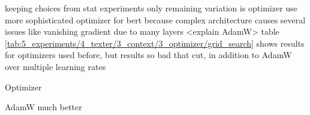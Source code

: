 keeping choices from stat experiments only remaining variation is optimizer
use more sophisticated optimizer for bert because complex architecture causes several issues like vanishing gradient due to many layers
<explain AdamW>
table \ref{tab:5_experiments/4_texter/3_context/3_optimizer/grid_search} shows results for optimizers used before, but results so bad that cut, in addition to AdamW over multiple learning rates

\begin{table}[h]
    \centering
    
    \caption{Optimizer}
    \label{tab:5_experiments/4_texter/3_context/3_optimizer/grid_search}
\end{table}

AdamW much better
